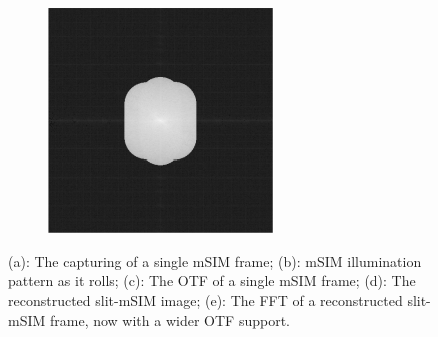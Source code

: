 \begin{figure}[h]
\begin{subfigure}[t]{0.23\textwidth}
      \caption{}
  \end{subfigure}~
  \begin{subfigure}[t]{0.23\textwidth}
        \centering
        \hspace{\textwidth}
    \end{subfigure}~
    \begin{subfigure}[t]{0.23\textwidth}
        \centering
        \includegraphics[width=\textwidth]{msim_slit/msim_recon_fft}
        \caption{}
    \end{subfigure}
      \caption{
      (a): The capturing of a single \gls{mSIM} frame;
      (b): \gls{mSIM} illumination pattern as it rolls;
      (c): The \gls{OTF} of a single \gls{mSIM} frame;
      (d): The reconstructed slit-\gls{mSIM} image;
      (e): The \gls{FFT} of a reconstructed slit-\gls{mSIM} frame, now with a wider \gls{OTF} support.
      }
      \label{fig:msim_slit}
\end{figure}
%
